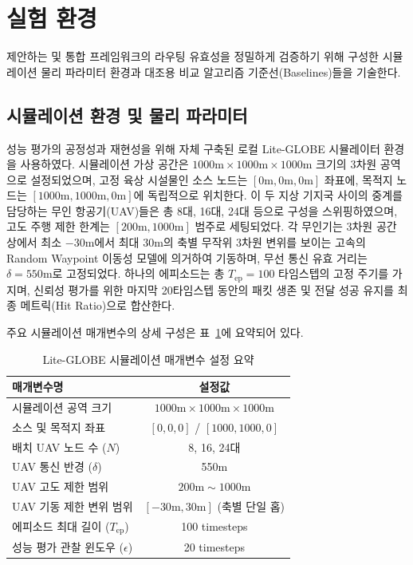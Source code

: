 \section{실험 환경}
\label{sec:실험환경}

제안하는 \method{} 및 통합 프레임워크의 라우팅 유효성을 정밀하게 검증하기 위해 구성한 시뮬레이션 물리 파라미터 환경과 대조용 비교 알고리즘 기준선(Baselines)들을 기술한다.

\subsection{시뮬레이션 환경 및 물리 파라미터}
성능 평가의 공정성과 재현성을 위해 자체 구축된 로컬 Lite-GLOBE 시뮬레이터 환경을 사용하였다. 
시뮬레이션 가상 공간은 $1000\text{m} \times 1000\text{m} \times 1000\text{m}$ 크기의 3차원 공역으로 설정되었으며, 고정 육상 시설물인 소스 노드는 $[0\text{m}, 0\text{m}, 0\text{m}]$ 좌표에, 목적지 노드는 $[1000\text{m}, 1000\text{m}, 0\text{m}]$에 독립적으로 위치한다. 이 두 지상 기지국 사이의 중계를 담당하는 무인 항공기(UAV)들은 총 8대, 16대, 24대 등으로 구성을 스위핑하였으며, 고도 주행 제한 한계는 $[200\text{m}, 1000\text{m}]$ 범주로 세팅되었다. 각 무인기는 3차원 공간 상에서 최소 $-30\text{m}$에서 최대 $30\text{m}$의 축별 무작위 3차원 변위를 보이는 고속의 Random Waypoint 이동성 모델에 의거하여 기동하며, 무선 통신 유효 거리는 $\delta = 550\text{m}$로 고정되었다. 하나의 에피소드는 총 $T_{\mathrm{ep}} = 100$ 타임스텝의 고정 주기를 가지며, 신뢰성 평가를 위한 마지막 20타임스텝 동안의 패킷 생존 및 전달 성공 유지를 최종 메트릭(Hit Ratio)으로 합산한다.

주요 시뮬레이션 매개변수의 상세 구성은 표~\ref{tab:sim_params_kci}에 요약되어 있다.

\begin{table}[htbp]
\centering
\caption{Lite-GLOBE 시뮬레이션 매개변수 설정 요약}
\label{tab:sim_params_kci}
\begin{tabular}{lc}
\toprule
매개변수명 & 설정값 \\
\midrule
시뮬레이션 공역 크기 & $1000\text{m} \times 1000\text{m} \times 1000\text{m}$ \\
소스 및 목적지 좌표 & $[0,0,0]$ / $[1000,1000,0]$ \\
배치 UAV 노드 수 ($N$) & 8, 16, 24대 \\
UAV 통신 반경 ($\delta$) & 550m \\
UAV 고도 제한 범위 & $200\text{m} \sim 1000\text{m}$ \\
UAV 기동 제한 변위 범위 & $[-30\text{m}, 30\text{m}]$ (축별 단일 홉) \\
에피소드 최대 길이 ($T_{\mathrm{ep}}$) & 100 timesteps \\
성능 평가 관찰 윈도우 ($\epsilon$) & 20 timesteps \\
\bottomrule
\end{tabular}
\end{table}

